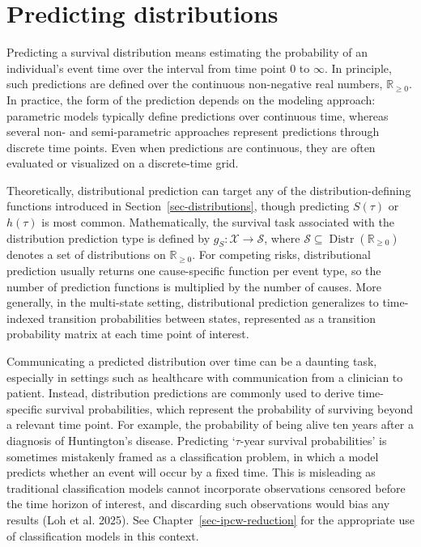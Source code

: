 \documentclass[
  letterpaper,
  krantz2]{style/krantz}
\begin{document}
\section{Predicting distributions}\label{sec-survtsk-dist}

Predicting a survival distribution means
estimating the probability of an individual's event time over the
interval from time point \(0\) to \(\infty\). In principle, such
predictions are defined over the continuous non-negative real numbers,
\(\mathbb{R}_{\geq 0}\). In practice, the form of the prediction depends
on the modeling approach: parametric models typically define predictions
over continuous time, whereas several non- and semi-parametric
approaches represent predictions through discrete time points. Even when
predictions are continuous, they are often evaluated or visualized on a
discrete-time grid.

Theoretically, distributional prediction can target any of the
distribution-defining functions introduced in
Section~\ref{sec-distributions}, though predicting \(S(\tau)\) or
\(h(\tau)\) is most
common. Mathematically,
the survival task associated with the distribution prediction type is
defined by \(g_S: \mathcal{X}\rightarrow \mathcal{S}\), where
\(\mathcal{S}\subseteq \operatorname{Distr}(\mathbb{R}_{\geq 0})\)
denotes a set of distributions on \(\mathbb{R}_{\geq 0}\). For competing
risks, distributional prediction usually returns
one cause-specific function per event type, so the number of prediction
functions is multiplied by the number of causes. More generally, in the
multi-state setting, distributional prediction
generalizes to time-indexed transition probabilities between states,
represented as a transition probability matrix at each time point of
interest.

Communicating a predicted distribution over time can be a daunting task,
especially in settings such as healthcare with communication from a
clinician to patient. Instead, distribution predictions are commonly
used to derive time-specific survival probabilities, which represent the
probability of surviving beyond a relevant time point. For example, the
probability of being alive ten years after a diagnosis of Huntington's
disease. Predicting `\(\tau\)-year survival
probabilities'
is sometimes mistakenly framed as a classification problem, in which a
model predicts whether an event will occur by a fixed time. This is
misleading as traditional classification models cannot incorporate
observations censored before the time horizon of interest, and
discarding such observations would bias any results (Loh et al. 2025).
See Chapter~\ref{sec-ipcw-reduction} for the appropriate use of
classification models in this context.
\end{document}
